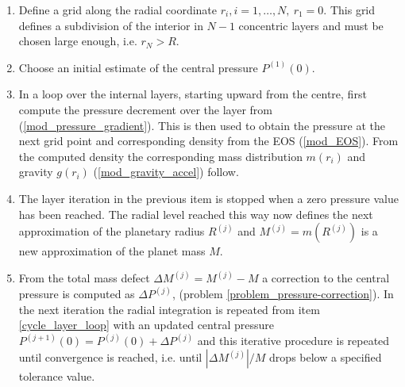 \begin{enumerate}
  \item
  Define a grid along the radial coordinate 
  $r_i, i=1,\ldots, N,~ r_1=0$. 
  This grid defines a subdivision of the interior in $N-1$ concentric layers and
  must be chosen large enough, i.e. $r_N > R$.
  \item
  Choose an initial estimate of the central pressure $P^{(1)}(0)$.
  \item
  \label{cycle_layer_loop}
  In a loop over the internal layers, starting upward from the centre,  
  first compute the pressure decrement over the layer from (\ref{mod_pressure_gradient}).
  This is then used to obtain the pressure at the next grid point and
  corresponding density from the EOS (\ref{mod_EOS}).
  From the computed density the corresponding mass distribution $m(r_i)$ and
  gravity $g(r_i)$ (\ref{mod_gravity_accel}) follow.
  \item
  \label{item_pressure-correction}
  The layer iteration in the previous item is stopped when a zero pressure 
  value has been reached. The radial level reached this way now defines 
  the next approximation of the planetary radius $R^{(j)}$ and 
  $M^{(j)}=m(R^{(j)})$ is a new approximation of the planet mass $M$.
  \item
  From the total mass defect $\Delta M^{(j)} = M^{(j)} -M$ a correction 
  to the central pressure is computed as $\Delta P^{(j)}$,
  (problem \ref{problem_pressure-correction}). 
  In the next iteration the radial integration is repeated from item 
  \ref{cycle_layer_loop} 
  with an updated central pressure $P^{(j+1)}(0) = P^{(j)}(0) + \Delta P^{(j)}$
  and this iterative procedure is repeated until convergence is reached, 
  i.e. until $|\Delta M^{(j)}|/M$ drops below a specified tolerance value. 
\end{enumerate}







